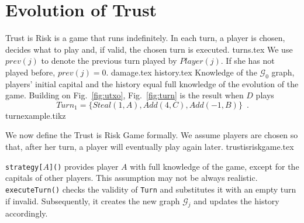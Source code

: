 \section{Evolution of Trust}
  Trust is Risk is a game that runs indefinitely. In each turn, a player is chosen, decides what to play and, if valid, the
  chosen turn is executed.
  {turns.tex}
  We use $prev\left(j\right)$ to denote the previous turn played by $Player(j)$. If she has not played before,
  $prev\left(j\right) = 0$.
  {damage.tex}
  {history.tex}
  \noindent Knowledge of the $\mathcal{G}_0$ graph, players' initial capital and the history equal full knowledge of
  the evolution of the game. Building on Fig.~\ref{fig:utxo}, Fig.~\ref{fig:turn} is the result when $D$ plays
  \begin{equation}
  \label{turnexample}
     Turn_1 = \{Steal\left(1, A\right), Add\left(4, C\right), Add\left(-1, B\right)\} \enspace.
  \end{equation}
  {turnexample.tikz}

  \noindent We now define the Trust is Risk Game formally. We assume players are chosen so that, after her turn, a player will
  eventually play again later.
  {trustisriskgame.tex}

  \noindent \texttt{strategy[}$A$\texttt{]()} provides player $A$ with full knowledge of the game, except for the capitals of
  other players. This assumption may not be always realistic. \texttt{executeTurn()} checks the validity of \texttt{Turn} and
  substitutes it with an empty turn if invalid. Subsequently, it creates the new graph $\mathcal{G}_j$ and updates the
  history accordingly.
